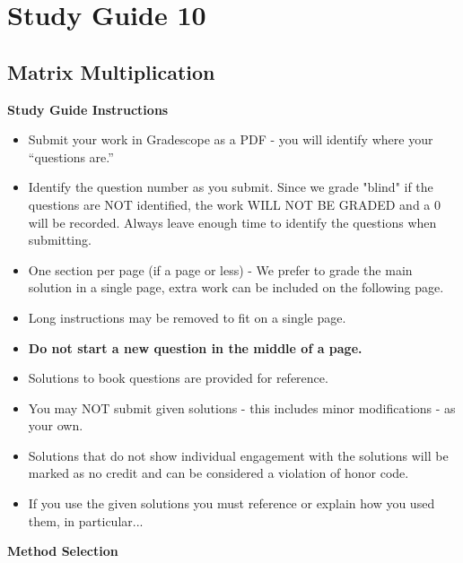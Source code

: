 \clearpage
\chapter{Study Guide 10}

\section{Matrix Multiplication}

\begin{center}
    \large{\textbf{Study Guide Instructions}}
\end{center}


\begin{itemize}
    \item Submit your work in Gradescope as a PDF - you will identify where your “questions are.”
    \item Identify the question number as you submit.  Since we grade "blind" if the questions are NOT identified, the work WILL NOT BE GRADED and a 0 will be recorded. Always leave enough time to 
    identify the questions when submitting.
    \item One section per page (if a page or less) - We prefer to grade the main solution in a single page, extra work can be included on the following page.
    \item Long instructions may be removed to fit on a single page.
    \item \textbf{Do not start a new question in the middle of a page.}
    \item Solutions to book questions are provided for reference.
    \item You may NOT submit given solutions - this includes minor modifications - as your own.
    \item Solutions that do not show individual engagement with the solutions will be marked as no credit and can be considered a violation of honor code.
    \item If you use the given solutions you must reference or explain how you used them, in particular...
\end{itemize}


\begin{center}
    \large{\textbf{Method Selection}}
\end{center}


